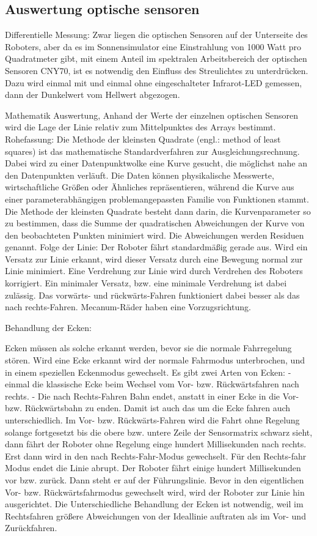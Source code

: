 \documentclass[a4paper,bibtotoc,oneside]{scrbook}
\begin{document}
\subsection{Auswertung optische sensoren}\thispagestyle{empty}
Differentielle Messung: Zwar liegen die optischen Sensoren auf der Unterseite des Roboters, aber da es im Sonnensimulator eine Einstrahlung von 1000 Watt pro Quadratmeter gibt, mit einem Anteil im spektralen Arbeitsbereich der optischen Sensoren CNY70, ist es notwendig den Einfluss des Streulichtes zu unterdrücken. Dazu wird einmal mit und einmal ohne eingeschalteter Infrarot-LED gemessen, dann der Dunkelwert vom Hellwert abgezogen.


Mathematik Auswertung,
Anhand der Werte der einzelnen optischen Sensoren wird die Lage der Linie relativ zum Mittelpunktes des Arrays bestimmt. 
Rohefassung: Die Methode der kleinsten Quadrate (engl.: method of least squares) ist das mathematische Standardverfahren zur Ausgleichungsrechnung. Dabei wird zu einer Datenpunktwolke eine Kurve gesucht, die möglichst nahe an den Datenpunkten verläuft. Die Daten können physikalische Messwerte, wirtschaftliche Größen oder Ähnliches repräsentieren, während die Kurve aus einer parameterabhängigen problemangepassten Familie von Funktionen stammt. Die Methode der kleinsten Quadrate besteht dann darin, die Kurvenparameter so zu bestimmen, dass die Summe der quadratischen Abweichungen der Kurve von den beobachteten Punkten minimiert wird. Die Abweichungen werden Residuen genannt.
\newline
Folge der Linie: Der Roboter fährt standardmäßig gerade aus. Wird ein Versatz zur Linie erkannt, wird dieser Versatz durch eine Bewegung normal zur Linie minimiert. Eine Verdrehung zur Linie wird durch Verdrehen des Roboters korrigiert. Ein minimaler Versatz, bzw. eine minimale Verdrehung ist dabei zulässig. 
Das vorwärts- und rückwärts-Fahren funktioniert dabei besser als das nach rechts-Fahren. Mecanum-Räder haben eine Vorzugsrichtung.

Behandlung der Ecken: 

Ecken müssen als solche erkannt werden, bevor sie die normale Fahrregelung stören.
Wird eine Ecke erkannt wird der normale Fahrmodus unterbrochen, und in einem speziellen Eckenmodus gewechselt.
Es gibt zwei Arten von Ecken: 
- einmal die klassische Ecke beim Wechsel vom Vor- bzw. Rückwärtsfahren nach rechts.
- Die nach Rechts-Fahren Bahn endet, anstatt in einer Ecke in die Vor- bzw. Rückwärtsbahn zu enden.
Damit ist auch das um die Ecke fahren auch unterschiedlich.
Im Vor- bzw. Rückwärts-Fahren wird die Fahrt ohne Regelung solange fortgesetzt bis die obere bzw. untere Zeile der Sensormatrix schwarz sieht, dann fährt der Roboter ohne Regelung einge hundert Millisekunden nach rechts. Erst dann wird in den nach Rechts-Fahr-Modus gewechselt.
Für den Rechts-fahr Modus endet die Linie abrupt. Der Roboter fährt einige hundert Millisekunden vor bzw. zurück. Dann steht er auf der Führungslinie. Bevor in den eigentlichen Vor- bzw. Rückwärtsfahrmodus gewechselt wird, wird der Roboter zur Linie hin ausgerichtet. Die Unterschiedliche Behandlung der Ecken ist notwendig, weil im Rechtsfahren größere Abweichungen von der Ideallinie auftraten als im Vor- und Zurückfahren.
\end{document}
